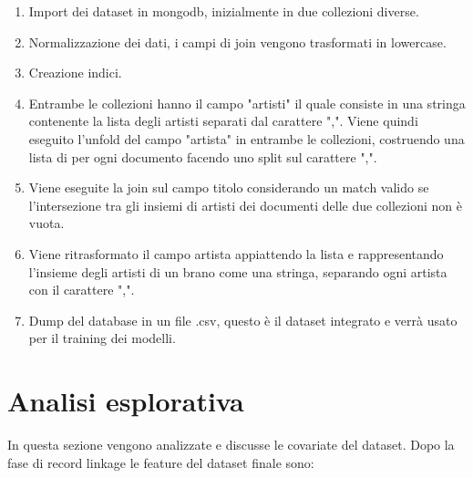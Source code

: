 \begin{enumerate}
	\item Import dei dataset in mongodb, inizialmente in due collezioni diverse.
	\item Normalizzazione dei dati, i campi di join vengono trasformati in lowercase.
	\item Creazione indici.
	\item Entrambe le collezioni hanno il campo "artisti" il quale consiste in una stringa contenente la lista degli artisti separati dal carattere ",". Viene quindi eseguito l'unfold del campo "artista" in entrambe le collezioni, costruendo una lista di per ogni documento facendo uno split sul carattere ",".
	\item Viene eseguite la join sul campo titolo considerando un match valido se l'intersezione tra gli insiemi di artisti dei documenti delle due collezioni non è vuota.
	\item Viene ritrasformato il campo artista appiattendo la lista e rappresentando l'insieme degli artisti di un brano come una stringa, separando ogni artista con il carattere ",".
	\item Dump del database in un file .csv, questo è il dataset integrato e verrà usato per il training dei modelli.
\end{enumerate}

\section{Analisi esplorativa}
In questa sezione vengono analizzate e discusse le covariate del dataset. Dopo la fase di record linkage le feature del dataset finale sono:

